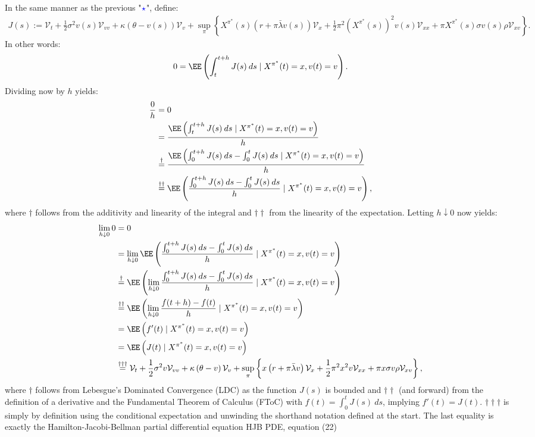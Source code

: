 \documentclass[11pt]{article}
\numberwithin{equation}{section}
\newcommand{\lc}{\left\{}
\newcommand{\rc}{\right\}}
\begin{document}
In the same manner as the previous "$\textcolor{blue}{\star}$", define:
\begin{align*}
    J(s):=\mathcal{V}_t + \frac{1}{2} \sigma^2 v (s) \mathcal{V}_{vv} + \kappa \left( \theta - v(s) \right) \mathcal{V}_v + \sup_\pi \lc X^{\pi^*}(s) \left( r + \pi \bar{\lambda} v(s) \right) \mathcal{V}_x + \frac{1}{2} \pi^2 (X^{\pi^*}(s))^2 v(s) \mathcal{V}_{xx} + \pi X^{\pi^*}(s) \sigma v(s) \rho \mathcal{V}_{xv} \rc.
\end{align*}
In other words:
\begin{align*}
    0 = \EE \left ( \int_t^{t+h}J(s)\:ds \mid X^{\pi^*}(t)=x,v(t)=v \right ).
\end{align*}
Dividing now by $h$ yields:
\begin{align*}
    \frac{0}{h}&=0\\
    &= \frac{\EE \left ( \int_t^{t+h}J(s)\:ds \mid X^{\pi^*}(t)=x,v(t)=v \right )}{h}\\
    &\overset{\dagger}{=}\frac{\EE \left ( \int_0^{t+h}J(s)\:ds-\int_0^{t}J(s)\:ds \mid X^{\pi^*}(t)=x,v(t)=v \right )}{h}\\
    &\overset{\dagger\dagger}{=}\EE \left ( \frac{\int_0^{t+h}J(s)\:ds-\int_0^{t}J(s)\:ds}{h} \mid X^{\pi^*}(t)=x,v(t)=v \right ),
\end{align*}
where $\dagger$ follows from the additivity and linearity of the integral and $\dagger \dagger$
from the linearity of the expectation.
Letting $h\downarrow 0$ now yields:
\begin{align*}
    \lim_{h\downarrow 0}0&=0\\
    &= \lim_{h\downarrow 0}\EE \left ( \frac{\int_0^{t+h}J(s)\:ds-\int_0^{t}J(s)\:ds}{h} \mid X^{\pi^*}(t)=x,v(t)=v \right )\\
    &\overset{\dagger}{=}\EE \left (\lim_{h\downarrow 0} \frac{\int_0^{t+h}J(s)\:ds-\int_0^{t}J(s)\:ds}{h} \mid X^{\pi^*}(t)=x,v(t)=v \right )\\
    &\overset{\dagger\dagger}{=}\EE \left (\lim_{h\downarrow 0} \frac{f(t+h)-f(t)}{h} \mid X^{\pi^*}(t)=x,v(t)=v \right )\\
    &=\EE \left ( f'(t) \mid X^{\pi^*}(t)=x,v(t)=v \right )\\
    &=\EE \left ( J(t) \mid X^{\pi^*}(t)=x,v(t)=v \right )\\
    &\overset{\dagger\dagger\dagger}{=}\mathcal{V}_t + \frac{1}{2} \sigma^2 v \mathcal{V}_{vv} + \kappa \left( \theta - v \right) \mathcal{V}_v + \sup_\pi \lc x \left( r + \pi \bar{\lambda} v \right) \mathcal{V}_x + \frac{1}{2} \pi^2 x^2 v \mathcal{V}_{xx} + \pi x \sigma v \rho \mathcal{V}_{xv} \rc,
\end{align*}
where $\dagger$ follows from Lebesgue's Dominated Convergence (LDC) as the
function $J(s)$ is bounded and
$\dagger\dagger$ (and forward) from the definition of a derivative and the
Fundamental Theorem of Calculus (FToC) with $f(t)=\int_0^t
J(s)\:ds$, implying $f'(t)=J(t)$. $\dagger\dagger\dagger$ is
simply by definition using the conditional expectation and unwinding the shorthand notation defined at the start. The last equality
is exactly the Hamilton-Jacobi-Bellman partial differential equation HJB PDE,
equation (22)
\end{document}
